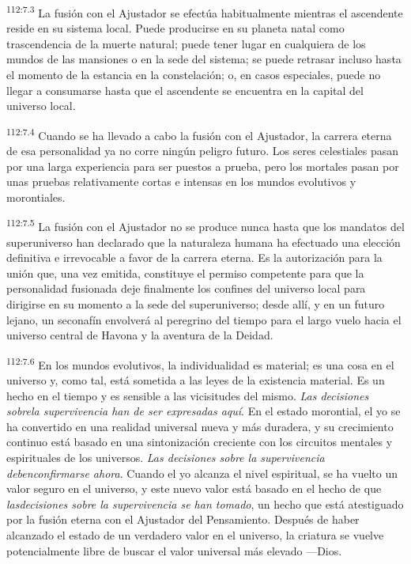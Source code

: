 \documentclass[twoside, 11pt]{book}
\begin{document}
\par
\textsuperscript{112:7.3} La fusión con el Ajustador se efectúa habitualmente mientras el ascendente reside en su sistema local. Puede producirse en su planeta natal como trascendencia de la muerte natural; puede tener lugar en cualquiera de los mundos de las mansiones o en la sede del sistema; se puede retrasar incluso hasta el momento de la estancia en la constelación; o, en casos especiales, puede no llegar a consumarse hasta que el ascendente se encuentra en la capital del universo local.

\par
\textsuperscript{112:7.4} Cuando se ha llevado a cabo la fusión con el Ajustador, la carrera eterna de esa personalidad ya no corre ningún peligro futuro. Los seres celestiales pasan por una larga experiencia para ser puestos a prueba, pero los mortales pasan por unas pruebas relativamente cortas e intensas en los mundos evolutivos y morontiales.

\par
\textsuperscript{112:7.5} La fusión con el Ajustador no se produce nunca hasta que los mandatos del superuniverso han declarado que la naturaleza humana ha efectuado una elección definitiva e irrevocable a favor de la carrera eterna. Es la autorización para la unión que, una vez emitida, constituye el permiso competente para que la personalidad fusionada deje finalmente los confines del universo local para dirigirse en su momento a la sede del superuniverso; desde allí, y en un futuro lejano, un seconafín envolverá al peregrino del tiempo para el largo vuelo hacia el universo central de Havona y la aventura de la Deidad.

\par
\textsuperscript{112:7.6} En los mundos evolutivos, la individualidad es material; es una cosa en el universo y, como tal, está sometida a las leyes de la existencia material. Es un hecho en el tiempo y es sensible a las vicisitudes del mismo. \textit{Las decisiones sobrela supervivencia han de ser expresadas aquí}. En el estado morontial, el yo se ha convertido en una realidad universal nueva y más duradera, y su crecimiento continuo está basado en una sintonización creciente con los circuitos mentales y espirituales de los universos. \textit{Las decisiones sobre la supervivencia debenconfirmarse ahora}. Cuando el yo alcanza el nivel espiritual, se ha vuelto un valor seguro en el universo, y este nuevo valor está basado en el hecho de que \textit{lasdecisiones sobre la supervivencia se han tomado}, un hecho que está atestiguado por la fusión eterna con el Ajustador del Pensamiento. Después de haber alcanzado el estado de un verdadero valor en el universo, la criatura se vuelve potencialmente libre de buscar el valor universal más elevado ---Dios.
\end{document}
